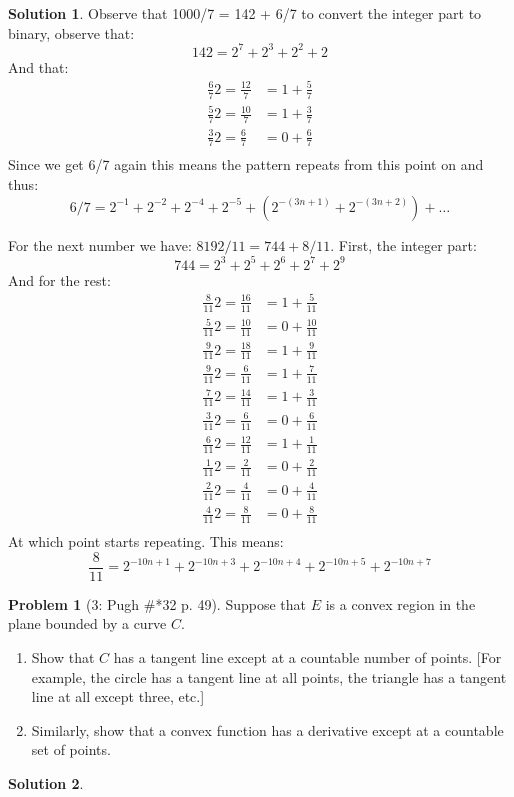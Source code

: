 \documentclass{article}
\theoremstyle{definition}
\newtheorem*{soln}{Solution}
\newtheorem*{prob}{Problem}
\theoremstyle{theorem}
\begin{document}
\begin{soln}
        Observe that 1000/7 = 142 + 6/7 to convert the integer part to binary, observe that:
        $$142 = 2^7 + 2^3+ 2^2 + 2$$
        And that:
        \begin{align*}
            \frac 67 2 = \frac{12}7 &= 1+ \frac 57\\
            \frac 57 2 = \frac{10}7 &= 1+ \frac 37\\
            \frac 37 2 = \frac{6}7 &= 0+ \frac 67\\
        \end{align*}
        Since we get 6/7 again this means the pattern repeats from this point on and thus: $$6/7 = 2^{-1} + 2^{-2}+ 2^{-4}+ 2^{-5} + (2^{-(3n+1)}+2^{-(3n+2)})+\ldots$$

        For the next number we have: $8192/11= 744 + 8/11$. First, the integer part:
        $$744 = 2^3+2^5+2^6+2^7+2^9$$
        And for the rest:
        \begin{align*}
            \frac 8{11} 2 = \frac{16}{11} &= 1+ \frac 5{11}\\
            \frac 5{11} 2 = \frac{10}{11} &= 0+ \frac {10}{11}\\
            \frac 9{11} 2 = \frac{18}{11} &= 1+ \frac 9{11}\\
            \frac 9{11} 2 = \frac{6}{11} &= 1+ \frac 7{11}\\
            \frac 7{11} 2 = \frac{14}{11} &= 1+ \frac 3{11}\\
            \frac 3{11} 2 = \frac{6}{11} &= 0+ \frac 6{11}\\
            \frac 6{11} 2 = \frac{12}{11} &= 1+ \frac {1}{11}\\
            \frac 1{11} 2 = \frac{2}{11} &= 0+ \frac {2}{11}\\
            \frac 2{11} 2 = \frac{4}{11} &= 0+ \frac {4}{11}\\
            \frac 4{11} 2 = \frac{8}{11} &= 0+ \frac {8}{11}\\
        \end{align*}
        At which point starts repeating. This means:
        $$\frac 8{11} = 2^{-10n +1}+2^{-10n +3}+2^{-10n +4}+2^{-10n +5}+2^{-10n +7}$$
\end{soln}
\vspace{1in}


\begin{prob}[3: Pugh \#*32 p. 49]
Suppose that $E$ is a convex region in the plane bounded by a curve $C$.
\begin{enumerate}
    \item Show that $C$ has a tangent line except at a countable number of points. [For example, the circle has a tangent line at all points, the triangle has a tangent line at all except three, etc.]
    \item Similarly, show that a convex function has a derivative except at a countable set of points.
\end{enumerate}
\end{prob}
\begin{soln}

\end{soln}
\vspace{1in}
\end{document}
